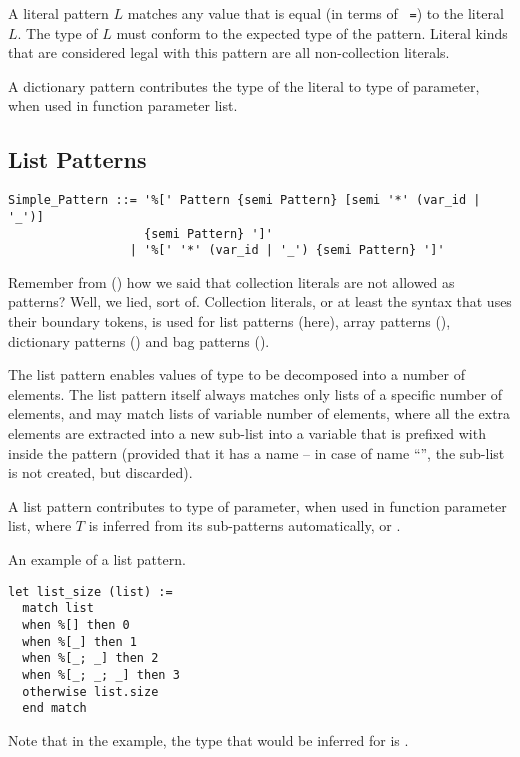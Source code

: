 A literal pattern $L$ matches any value that is equal (in terms of ~\lstinline!=!) to the literal $L$. The type of $L$ must conform to the expected type of the pattern. Literal kinds that are considered legal with this pattern are all non-collection literals. 

A dictionary pattern contributes the type of the literal to type of parameter, when used in function parameter list. 





\subsection{List Patterns}
\label{sec:list-patterns}

\syntax\begin{lstlisting}
Simple_Pattern ::= '%[' Pattern {semi Pattern} [semi '*' (var_id | '_')] 
                   {semi Pattern} ']'
                 | '%[' '*' (var_id | '_') {semi Pattern} ']'
\end{lstlisting}

Remember from () how we said that collection literals are not allowed as patterns? Well, we lied, sort of. Collection literals, or at least the syntax that uses their boundary tokens, is used for list patterns (here), array patterns (), dictionary patterns () and bag patterns (). 

The list pattern enables values of  type to be decomposed into a number of elements. The list pattern itself always matches only lists of a specific number of elements, and may match lists of variable number of elements, where all the extra elements are extracted into a new sub-list into a variable that is prefixed with \code{*} inside the pattern (provided that it has a name -- in case of name ``\code{_}'', the sub-list is not created, but discarded). 

A list pattern contributes  to type of parameter, when used in function parameter list, where $T$ is inferred from its sub-patterns automatically, or . 

\example An example of a list pattern.
\begin{lstlisting}
let list_size (list) := 
  match list 
  when %[] then 0
  when %[_] then 1
  when %[_; _] then 2
  when %[_; _; _] then 3
  otherwise list.size
  end match
\end{lstlisting}
Note that in the example, the type that would be inferred for  is . 




